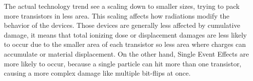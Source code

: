 The actual technology trend see a scaling down to smaller sizes, trying to pack more transistors in less area. This scaling affects how radiations modify the behavior of the devices. Those devices are generally less affected by cumulative damage, it means that total ionizing dose or displacement damages are less likely to occur due to the smaller area of each transistor so less area where charges can accumulate or material displacement. On the other hand, Single Event Effects are more likely to occur, because a single particle can hit more than one transistor, causing a more complex damage like multiple bit-flips at once. 
